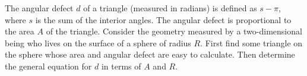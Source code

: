 The angular defect $d$ of a triangle (measured in radians) is defined as $s-\pi$, where $s$ is the sum of the interior angles.
The angular defect is proportional to the area $A$ of the triangle.
Consider the geometry measured by a two-dimensional being who lives on the surface of a sphere of radius $R$.
First find some triangle on the sphere whose area and angular defect are easy to calculate. Then determine the
general equation for $d$ in terms of $A$ and $R$.\answercheck
